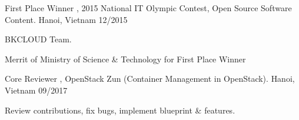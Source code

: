 
\begin{cvhonors}

  \cvhonor
    {First Place Winner} %
    {, 2015 National IT Olympic Contest, Open Source Software Content.} %
    {Hanoi, Vietnam} %
    {12/2015} %

  \cvhonor
 	{} %
	{BKCLOUD Team.} %
    {} %
    {} %

  \cvhonor
    {Merrit of Ministry of Science \& Technology for First Place Winner} %
    {} %
    {} %
    {} %

  \cvhonor
    {Core Reviewer} %
    {, OpenStack Zun (Container Management in OpenStack).} %
    {Hanoi, Vietnam} %
    {09/2017} %

  \cvhonor
 	{} %
	{Review contributions, fix bugs, implement blueprint \& features.} %
    {} %
    {} %

\end{cvhonors}
